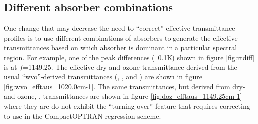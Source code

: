 \subsection{Different absorber combinations}
\label{sec:absorber_combos}
One change that may decrease the need to ``correct'' effective transmittance profiles is to use different combinations of absorbers to generate the effective transmittances based on which absorber is dominant in a particular spectral region. For example, one of the peak differences (~0.1K) shown in figure \ref{fig:rtdiff} is at $f$=1149.25\invcm{}. The effective dry and ozone transmittance derived from the usual ``wvo''-derived transmittances (, , and ) are shown in figure \ref{fig:wvo_efftaus_1020.0cm-1}. The same transmittances, but derived from dry-and-ozone, , transmittances are shown in figure \ref{fig:doz_efftaus_1149.25cm-1} where they are do not exhibit the ``turning over'' feature that requires correcting to use in the CompactOPTRAN regression scheme.

